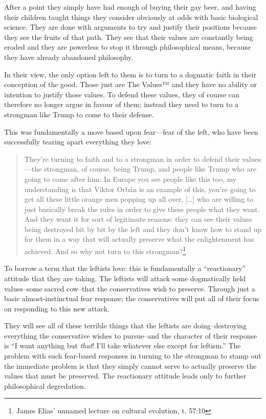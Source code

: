\documentclass[11pt]{article}
\begin{document}
After a point they simply have had enough of buying their gay beer, and having their children taught things they consider obviously at odds with basic biological science. They are done with arguments to try and justify their positions because they see the fruits of that path. They see that their values are constantly being eroded and they are powerless to stop it through philosophical means, because they have already abandoned philosophy.

In their view, the only option left to them is to turn to a dogmatic faith in their conception of the good. Those just are The Values™ and they have no ability or intention to justify those values. To defend these values, they of course can therefore no longer argue in favour of them; instead they need to turn to a strongman like Trump to come to their defense.

This was fundamentally a move based upon fear---fear of the left, who have been successfully tearing apart everything they love:
\begin{quote}
They're turning to faith and to a strongman in order to defend their values---the strongman, of course, being Trump, and people like Trump who are going to come after him. In Europe you see people like this too, my understanding is that Viktor Orbán is an example of this, you're going to get all these little orange men popping up all over, [\ldots{}] who are willing to just basically break the rules in order to give these people what they want. And they want it for sort of legitimate reasons: they can see their values being destroyed bit by bit by the left and they don't know how to stand up for them in a way that will actually preserve what the enlightenment has achieved. And so why not turn to this strongman?\footnote{James Elias' unnamed lecture on cultural evolution, t. 57:10}
\end{quote}

To borrow a term that the leftists love: this is fundamentally a ``reactionary'' attitude that they are taking. The leftists will attack some dogmatically held values--some sacred cow--that the conservatives wish to preserve. Through just a basic almost-instinctual fear response; the conservatives will put all of their focus on responding to this new attack.

They will see all of these terrible things that the leftists are doing--destroying everything the conservative wishes to pursue--and the character of their response is ``I want anything but \emph{that}! I'll take whatever else except for leftism.'' The problem with such fear-based responses in turning to the strongman to stamp out the immediate problem is that they simply cannot serve to actually preserve the values that must be preserved. The reactionary attitude leads only to further philosophical degredation.
\end{document}
